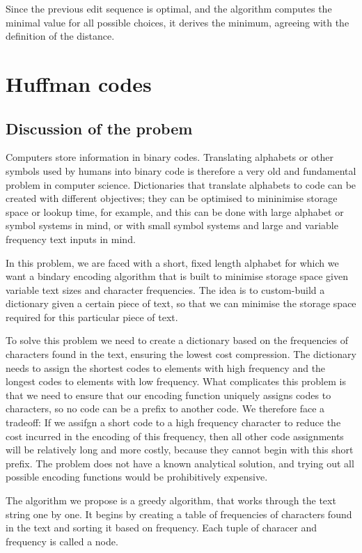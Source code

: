\documentclass[11pt]{article}
\begin{document}
Since the previous edit sequence is optimal, and the algorithm computes
the minimal value for all possible choices, it derives the minimum,
agreeing with the definition of the distance.

    \section{Huffman codes}\label{huffman-codes}

\subsection{Discussion of the probem}\label{discussion-of-the-probem}

Computers store information in binary codes. Translating alphabets or
other symbols used by humans into binary code is therefore a very old
and fundamental problem in computer science. Dictionaries that translate
alphabets to code can be created with different objectives; they can be
optimised to mininimise storage space or lookup time, for example, and
this can be done with large alphabet or symbol systems in mind, or with
small symbol systems and large and variable frequency text inputs in
mind.

In this problem, we are faced with a short, fixed length alphabet for
which we want a bindary encoding algorithm that is built to minimise
storage space given variable text sizes and character frequencies. The
idea is to custom-build a dictionary given a certain piece of text, so
that we can minimise the storage space required for this particular
piece of text.

To solve this problem we need to create a dictionary based on the
frequencies of characters found in the text, ensuring the lowest cost
compression. The dictionary needs to assign the shortest codes to
elements with high frequency and the longest codes to elements with low
frequency. What complicates this problem is that we need to ensure that
our encoding function uniquely assigns codes to characters, so no code
can be a prefix to another code. We therefore face a tradeoff: If we
assifgn a short code to a high frequency character to reduce the cost
incurred in the encoding of this frequency, then all other code
assignments will be relatively long and more costly, because they cannot
begin with this short prefix. The problem does not have a known
analytical solution, and trying out all possible encoding functions
would be prohibitively expensive.

The algorithm we propose is a greedy algorithm, that works through the
text string one by one. It begins by creating a table of frequencies of
characters found in the text and sorting it based on frequency. Each
tuple of characer and frequency is called a node.
\end{document}
